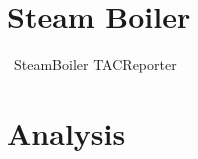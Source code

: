 \documentclass{report} %
\begin{document}
\chapter{Steam Boiler}
\begin{circus}
  \circprocess\ SteamBoiler \circdef TACReporter
\end{circus}



\chapter{Analysis}

%
\end{document}
